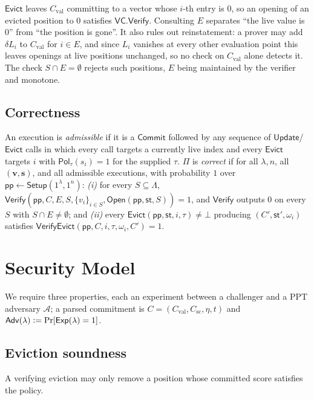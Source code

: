\documentclass[version=submission]{iacrcc}
\theoremstyle{definition}
\newcommand{\secpar}{\lambda}
\newcommand{\PPT}{\mathrm{PPT}}
\newcommand{\defeq}{\vcentcolon=}
\newcommand{\Setup}{\mathsf{Setup}}
\newcommand{\Commit}{\mathsf{Commit}}
\newcommand{\Open}{\mathsf{Open}}
\newcommand{\Vfy}{\mathsf{Verify}}
\newcommand{\Update}{\mathsf{Update}}
\newcommand{\Evict}{\mathsf{Evict}}
\newcommand{\VfyEvict}{\mathsf{VerifyEvict}}
\newcommand{\pp}{\mathsf{pp}}
\newcommand{\aux}{\mathsf{st}}
\newcommand{\Pol}{\mathsf{Pol}}
\newcommand{\Adv}{\mathsf{Adv}}
\newcommand{\Exp}{\mathsf{Exp}}
\newcommand{\Val}{\mathrm{val}}
\newcommand{\Sc}{\mathrm{sc}}
\newcommand{\Cval}{C_{\Val}}
\newcommand{\Csc}{C_{\Sc}}
\newcommand{\Live}{\Lambda}
\newcommand{\Evicted}{E}
\newcommand{\A}{\mathcal{A}}
\newcommand{\VC}{\mathsf{VC}}
\begin{document}
\begin{remark}[Why $\Vfy$ consults $\Evicted$]\label{rem:live}
$\Evict$ leaves $\Cval$ committing to a vector whose $i$-th entry is $0$, so an
opening of an evicted position to $0$ satisfies $\VC.\Vfy$. Consulting $\Evicted$
separates ``the live value is $0$'' from ``the position is gone''. It also rules
out reinstatement: a prover may add $\delta L_i$ to $\Cval$ for $i\in\Evicted$,
and since $L_i$ vanishes at every other evaluation point this leaves openings at
live positions unchanged, so no check on $\Cval$ alone detects it. The check
$S\cap\Evicted=\emptyset$ rejects such positions, $\Evicted$ being maintained by
the verifier and monotone.
\end{remark}

\subsection{Correctness}

\begin{definition}[Correctness]\label{def:correct}
An execution is \emph{admissible} if it is a $\Commit$ followed by any sequence
of $\Update$/$\Evict$ calls in which every call targets a currently live index
and every $\Evict$ targets $i$ with $\Pol_\tau(s_i)=1$ for the supplied $\tau$.
$\Pi$ is \emph{correct} if for all $\secpar,n$, all
$(\mathbf{v},\mathbf{s})$, and all admissible executions, with probability $1$
over $\pp\leftarrow\Setup(1^\secpar,1^n)$: \emph{(i)} for every $S\subseteq\Live$,
$\Vfy(\pp,C,\Evicted,S,\{v_i\}_{i\in S},\Open(\pp,\aux,S))=1$, and $\Vfy$
outputs $0$ on every $S$ with $S\cap\Evicted\neq\emptyset$; and \emph{(ii)} every
$\Evict(\pp,\aux,i,\tau)\neq\bot$ producing $(C',\aux',\omega_i)$ satisfies
$\VfyEvict(\pp,C,i,\tau,\omega_i,C')=1$.
\end{definition}

\section{Security Model}\label{sec:secmodel}

We require three properties, each an experiment between a challenger and a
$\PPT$ adversary $\A$; a parsed commitment is $C=(\Cval,\Csc,\eta,t)$ and
$\Adv(\secpar)\defeq\Pr[\Exp(\secpar)=1]$.

\subsection{Eviction soundness}
A verifying eviction may only remove a position whose committed score satisfies
the policy.
\end{document}
